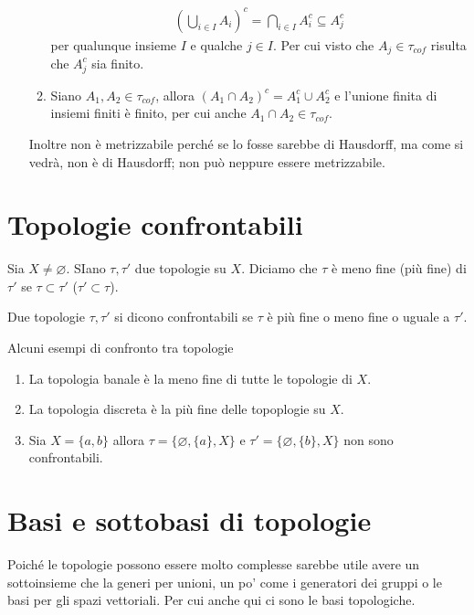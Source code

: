 \begin{enumerate}
\begin{enumerate}
\begin{equation}
				\begin{aligned}	
					\left(\bigcup_{i \in I} A_i\right)^c = \bigcap_{i \in I} A^c_i \subseteq A^c_j
				\end{aligned}
			\end{equation}
		per qualunque insieme $I$ e qualche $j \in I$. Per cui visto che $A_j \in \tau_{cof}$ risulta che $A^c_j$ sia finito.
		\item Siano $A_1, A_2 \in \tau_{cof}$, allora $(A_1 \cap A_2)^c = A^c_1 \cup A^c_2$ e l'unione finita di insiemi finiti è finito, per cui anche $A_1 \cap A_2 \in \tau_{cof}$. 
	\end{enumerate}	
	Inoltre non è metrizzabile perché se lo fosse sarebbe di Hausdorff, ma come si vedrà, non è di Hausdorff; non può neppure essere metrizzabile.
\end{enumerate}

\section{Topologie confrontabili}
\begin{definition}
	Sia $X \neq \varnothing$. SIano $\tau, \tau'$ due topologie su $X$. Diciamo che $\tau$ è meno fine (più fine) di $\tau'$ se $\tau \subset \tau'$ ($\tau' \subset \tau$).
\end{definition}
\begin{definition}
	Due topologie $\tau, \tau'$ si dicono confrontabili se $\tau$ è più fine o meno fine o uguale a $\tau'$.
\end{definition}

Alcuni esempi di confronto tra topologie
\begin{enumerate}
	\item La topologia banale è la meno fine di tutte le topologie di $X$.
	\item La topologia discreta è la più fine delle topoplogie su $X$.
	\item Sia $X = \{a,b\}$ allora $\tau = \{\varnothing,\{a\}, X\}$ e $\tau' = \{\varnothing, \{b\}, X\}$ non sono confrontabili.
\end{enumerate}


\section{Basi e sottobasi di topologie}

Poiché le topologie possono essere molto complesse sarebbe utile avere un sottoinsieme che la generi per unioni, un po' come i generatori dei gruppi o le basi per gli spazi vettoriali. Per cui anche qui ci sono le basi topologiche.


